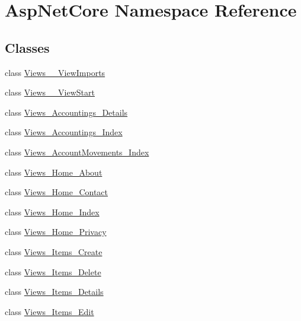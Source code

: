 \hypertarget{namespace_asp_net_core}{}\section{Asp\+Net\+Core Namespace Reference}
\label{namespace_asp_net_core}
\subsection*{Classes}
\begin{DoxyCompactItemize}
\item 
class \mbox{\hyperlink{class_asp_net_core_1_1_views_____view_imports}{Views\+\_\+\+\_\+\+View\+Imports}}
\item 
class \mbox{\hyperlink{class_asp_net_core_1_1_views_____view_start}{Views\+\_\+\+\_\+\+View\+Start}}
\item 
class \mbox{\hyperlink{class_asp_net_core_1_1_views___accountings___details}{Views\+\_\+\+Accountings\+\_\+\+Details}}
\item 
class \mbox{\hyperlink{class_asp_net_core_1_1_views___accountings___index}{Views\+\_\+\+Accountings\+\_\+\+Index}}
\item 
class \mbox{\hyperlink{class_asp_net_core_1_1_views___account_movements___index}{Views\+\_\+\+Account\+Movements\+\_\+\+Index}}
\item 
class \mbox{\hyperlink{class_asp_net_core_1_1_views___home___about}{Views\+\_\+\+Home\+\_\+\+About}}
\item 
class \mbox{\hyperlink{class_asp_net_core_1_1_views___home___contact}{Views\+\_\+\+Home\+\_\+\+Contact}}
\item 
class \mbox{\hyperlink{class_asp_net_core_1_1_views___home___index}{Views\+\_\+\+Home\+\_\+\+Index}}
\item 
class \mbox{\hyperlink{class_asp_net_core_1_1_views___home___privacy}{Views\+\_\+\+Home\+\_\+\+Privacy}}
\item 
class \mbox{\hyperlink{class_asp_net_core_1_1_views___items___create}{Views\+\_\+\+Items\+\_\+\+Create}}
\item 
class \mbox{\hyperlink{class_asp_net_core_1_1_views___items___delete}{Views\+\_\+\+Items\+\_\+\+Delete}}
\item 
class \mbox{\hyperlink{class_asp_net_core_1_1_views___items___details}{Views\+\_\+\+Items\+\_\+\+Details}}
\item 
class \mbox{\hyperlink{class_asp_net_core_1_1_views___items___edit}{Views\+\_\+\+Items\+\_\+\+Edit}}
\item 

\end{DoxyCompactItemize}
